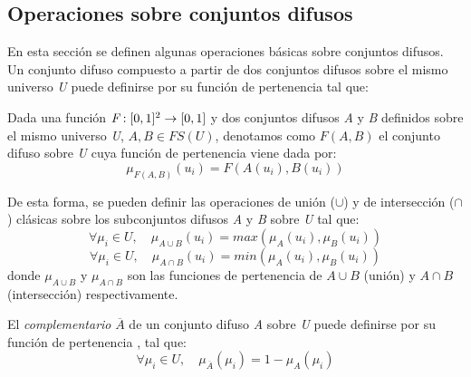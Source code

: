 \subsection{Operaciones sobre conjuntos difusos}
\label{sec:fuzzy-set-operations}
En esta sección se definen algunas operaciones básicas sobre conjuntos difusos. Un conjunto difuso compuesto a partir de dos conjuntos difusos sobre el mismo universo \emph{U} puede definirse por su función de pertenencia tal que:
\begin{definition}
Dada una función \begin{math}\emph{F}:[0,1]^2\rightarrow[0,1]\end{math} y dos conjuntos difusos \emph{A} y \emph{B} definidos sobre el mismo universo \emph{U}, \begin{math}A,B\in FS(U)\end{math}, denotamos como \begin{math}F(A,B)\end{math} el conjunto difuso sobre \emph{U} cuya función de pertenencia viene dada por:
\begin{equation}
\mu_{F(A,B)}(u_{i}) = F(A(u_{i}),B(u_{i}))
\end{equation}
\end{definition}
De esta forma, se pueden definir las operaciones de unión ($\cup$) y de intersección ($\cap$) clásicas sobre los subconjuntos difusos \emph{A} y \emph{B} sobre \emph{U} \cite{dubois1980} tal que:
\begin{equation}
\forall\mu_{i}\in U,\quad\mu_{A\cup B}(u_{i}) = max(\mu_{A}(u_{i}),\mu_{B}(u_{i}))
\end{equation}
\begin{equation}
\forall\mu_{i}\in U,\quad\mu_{A\cap B}(u_{i}) = min(\mu_{A}(u_{i}),\mu_{B}(u_{i}))
\end{equation}
donde $\mu_{A\cup B}$ y $\mu_{A\cap B}$ son las funciones de pertenencia de $A\cup B$ (unión) y $A\cap B$ (intersección) respectivamente.
\begin{definition}
El \emph{complementario} \emph{$\overline{A}$} de un conjunto difuso \emph{A} sobre \emph{U} puede definirse por su función de pertenencia \cite{Zadeh65}, tal que:
\begin{equation}
\forall \mu_{i} \in U, \quad \mu_{\overline{A}}(\mu_{i}) = 1 - \mu_{A}(\mu_{i})
\end{equation}
\end{definition}



